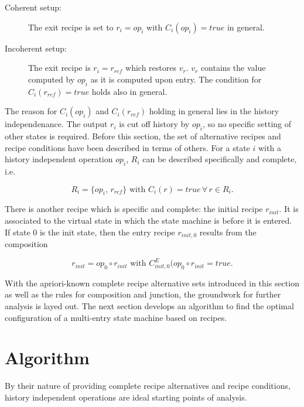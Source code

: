 \documentclass[12pt,a4paper]{scrartcl}
\begin{document}
\begin{description}

    \item[Coherent setup:] The exit recipe is set to $r_i=op_i$ with 
        $C_i(op_i)=true$ in general.

    \item[Incoherent setup:] The exit recipe is $r_i=r_{ref}$ which restores
        $v_r$.  $v_r$ contains the value computed by $op_i$ as it is computed
        upon entry. The condition for $C_i(r_{ref})=true$ holds also in
        general.

\end{description}

The reason for $C_i(op_i)$ and $C_i(r_{ref})$ holding in general lies in the
history independenance. The output $r_i$ is cut off history by $op_i$, so no
specific setting of other states is required. Before this section, the set of
alternative recipes and recipe conditions have been described in terms of
others. For a state $i$ with a history independent operation $op_i$, $R_i$ can
be described specifically and complete, i.e.

\begin{equation} \label{eq:history-independent-completeness}
    R_i = \{ op_i,\, r_{ref} \}\,\,\mbox{with}\,\,C_i(r)=true\,\forall\,r\in R_i.
\end{equation}

There is another recipe which is specific and complete: the initial recipe
$r_{init}$.  It is associated to the virtual state in which the state machine
is before it is entered. If state $0$ is the init state, then the entry recipe
$r_{init,0}$ results from the composition

\begin{equation}
    r_{init} = op_0 \circ r_{init} \,\, \mbox{with} \,\, C^E_{init,0}(op_0\circ r_{init}=true.
\end{equation}

With the apriori-known complete recipe alternative sets introduced in this
section as well as the rules for composition and junction, the groundwork for
further analysis is layed out. The next section develops an algorithm to find
the optimal configuration of a multi-entry state machine based on recipes.

\section{Algorithm}

By their nature of providing complete recipe alternatives and recipe conditions,
history independent operations are ideal starting points of analysis. 
\end{document}
